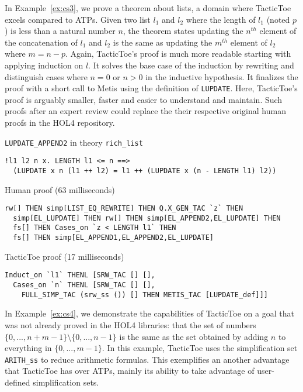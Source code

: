 \documentclass[runningheads,a4paper,draft]{svjour3}
\def\holfour{\textsf{HOL4}\xspace}
\def\metis{\textsf{Metis}\xspace}
\def\tactictoe{\textsf{TacticToe}\xspace}
\begin{document}
In Example~\ref{ex:cs3}, we prove a theorem about lists, a domain where \tactictoe excels compared to ATPs.
Given two list $l_1$ and $l_2$ where the length of $l_1$ (noted $p$) is less
than a natural
number $n$, the theorem states updating the $n^{th}$
element of the concatenation of $l_1$ and $l_2$ is the same as
updating the $m^{th}$ element of $l_2$ where $m = n - p$. Again,
\tactictoe's proof is
much more readable starting with applying induction on $l$. It solves the base
case of the induction by rewriting and distinguish cases where $n=0$ or $n>0$
in the inductive hypothesis. It finalizes the proof with a short call to \metis
using the definition of
\texttt{LUPDATE}. Here, \tactictoe's proof is arguably smaller, faster and
easier to
understand and maintain. Such proofs after an expert review could replace the
their respective original human proofs in the \holfour repository.

\begin{example}\label{ex:cs3} \texttt{LUPDATE\_APPEND2} in theory
\texttt{rich\_list}
\begin{lstlisting}[language=SMLSmall]
!l1 l2 n x. LENGTH l1 <= n ==>
  (LUPDATE x n (l1 ++ l2) = l1 ++ (LUPDATE x (n - LENGTH l1) l2))
\end{lstlisting}
Human proof (63 milliseconds)
\begin{lstlisting}[language=SMLSmall]
  rw[] THEN simp[LIST_EQ_REWRITE] THEN Q.X_GEN_TAC `z` THEN
  simp[EL_LUPDATE] THEN rw[] THEN simp[EL_APPEND2,EL_LUPDATE] THEN
  fs[] THEN Cases_on `z < LENGTH l1` THEN
  fs[] THEN simp[EL_APPEND1,EL_APPEND2,EL_LUPDATE]
\end{lstlisting}
\tactictoe proof (17 milliseconds)
\begin{lstlisting}[language=SMLSmall]
Induct_on `l1` THENL [SRW_TAC [] [],
  Cases_on `n` THENL [SRW_TAC [] [],
    FULL_SIMP_TAC (srw_ss ()) [] THEN METIS_TAC [LUPDATE_def]]]
\end{lstlisting}
\end{example}

In Example~\ref{ex:cs4}, we demonstrate the capabilities of \tactictoe on a
goal that was not already proved in the \holfour libraries: that the set of
numbers $\{0,...,n+m-1\} \setminus \{0,...,n-1\}$ is the same as the set
obtained by adding $n$ to everything in $\{0,...,m-1\}$. In this example,
\tactictoe uses the simplification set \texttt{ARITH\_ss} to reduce arithmetic
formulas. This exemplifies an another advantage that \tactictoe has over ATPs,
mainly its ability to take advantage of user-defined simplification sets.
\end{document}
